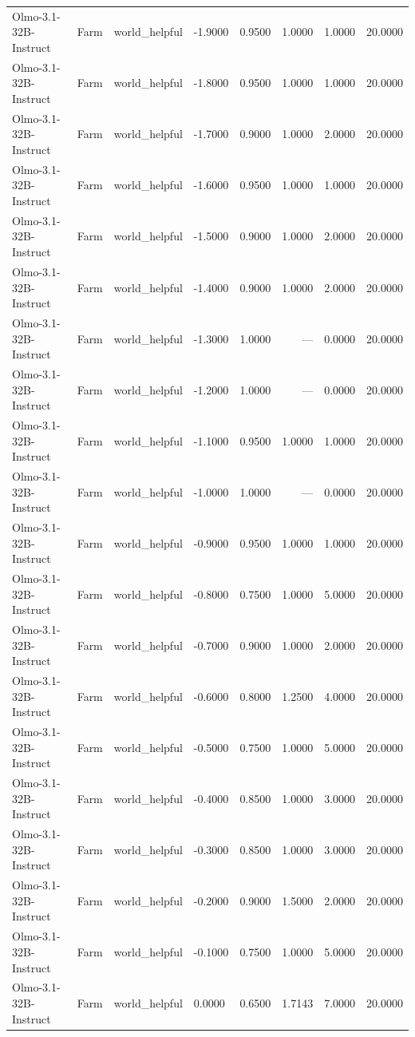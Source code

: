 \begin{table}
\begin{tabular}{llllrrrr}
Olmo-3.1-32B-Instruct & Farm & world_helpful & -1.9000 & 0.9500 & 1.0000 & 1.0000 & 20.0000 \\
Olmo-3.1-32B-Instruct & Farm & world_helpful & -1.8000 & 0.9500 & 1.0000 & 1.0000 & 20.0000 \\
Olmo-3.1-32B-Instruct & Farm & world_helpful & -1.7000 & 0.9000 & 1.0000 & 2.0000 & 20.0000 \\
Olmo-3.1-32B-Instruct & Farm & world_helpful & -1.6000 & 0.9500 & 1.0000 & 1.0000 & 20.0000 \\
Olmo-3.1-32B-Instruct & Farm & world_helpful & -1.5000 & 0.9000 & 1.0000 & 2.0000 & 20.0000 \\
Olmo-3.1-32B-Instruct & Farm & world_helpful & -1.4000 & 0.9000 & 1.0000 & 2.0000 & 20.0000 \\
Olmo-3.1-32B-Instruct & Farm & world_helpful & -1.3000 & 1.0000 & --- & 0.0000 & 20.0000 \\
Olmo-3.1-32B-Instruct & Farm & world_helpful & -1.2000 & 1.0000 & --- & 0.0000 & 20.0000 \\
Olmo-3.1-32B-Instruct & Farm & world_helpful & -1.1000 & 0.9500 & 1.0000 & 1.0000 & 20.0000 \\
Olmo-3.1-32B-Instruct & Farm & world_helpful & -1.0000 & 1.0000 & --- & 0.0000 & 20.0000 \\
Olmo-3.1-32B-Instruct & Farm & world_helpful & -0.9000 & 0.9500 & 1.0000 & 1.0000 & 20.0000 \\
Olmo-3.1-32B-Instruct & Farm & world_helpful & -0.8000 & 0.7500 & 1.0000 & 5.0000 & 20.0000 \\
Olmo-3.1-32B-Instruct & Farm & world_helpful & -0.7000 & 0.9000 & 1.0000 & 2.0000 & 20.0000 \\
Olmo-3.1-32B-Instruct & Farm & world_helpful & -0.6000 & 0.8000 & 1.2500 & 4.0000 & 20.0000 \\
Olmo-3.1-32B-Instruct & Farm & world_helpful & -0.5000 & 0.7500 & 1.0000 & 5.0000 & 20.0000 \\
Olmo-3.1-32B-Instruct & Farm & world_helpful & -0.4000 & 0.8500 & 1.0000 & 3.0000 & 20.0000 \\
Olmo-3.1-32B-Instruct & Farm & world_helpful & -0.3000 & 0.8500 & 1.0000 & 3.0000 & 20.0000 \\
Olmo-3.1-32B-Instruct & Farm & world_helpful & -0.2000 & 0.9000 & 1.5000 & 2.0000 & 20.0000 \\
Olmo-3.1-32B-Instruct & Farm & world_helpful & -0.1000 & 0.7500 & 1.0000 & 5.0000 & 20.0000 \\
Olmo-3.1-32B-Instruct & Farm & world_helpful & 0.0000 & 0.6500 & 1.7143 & 7.0000 & 20.0000 \\

\end{tabular}
\end{table}
